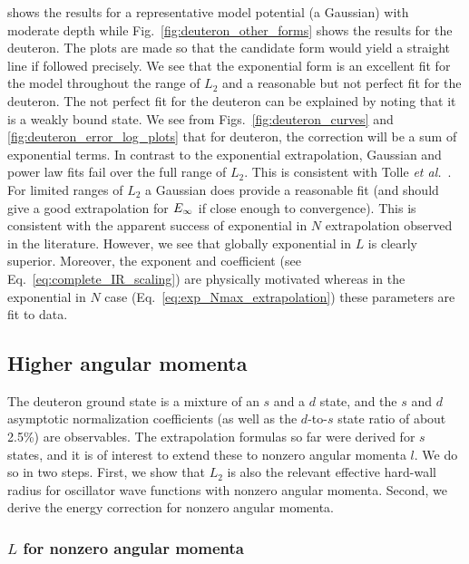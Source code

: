 	shows the results for a representative model potential (a Gaussian)
	with moderate depth while Fig.~\ref{fig:deuteron_other_forms} shows
	the results for the deuteron.  The plots are made so that the
	candidate form would yield a straight line if followed precisely.  We
	see that the exponential form is an excellent fit for the model
	throughout the range of $L_2$ and a reasonable but not perfect fit for
	the deuteron.  The not perfect fit for the deuteron can be explained
	by noting that it is a weakly bound state.  We see from
	Figs.~\ref{fig:deuteron_curves} and \ref{fig:deuteron_error_log_plots}
	that for deuteron, the correction will be a sum of exponential terms.
	In contrast to the exponential extrapolation, Gaussian and power law fits
	fail over the full range of $L_2$.  This is consistent with
	Tolle {\it et al.}~\cite{Tolle:2012cx}.  For limited ranges of $L_2$ a
	Gaussian does	provide a reasonable fit (and should give a good extrapolation
	for	$E_{\infty}$ if close enough to convergence).  This is consistent with the
	apparent success of exponential in $N$ extrapolation observed in the
	literature.  However, we see that globally exponential in $L$ is clearly
	superior.  Moreover, the exponent and coefficient (see
	Eq.~\eqref{eq:complete_IR_scaling}) are physically motivated whereas in the
	exponential in $N$ case (Eq.~\eqref{eq:exp_Nmax_extrapolation}) these
	parameters are fit to data.


	\subsection{Higher angular momenta}
	\label{subsec:higher_angular_momenta}

	The deuteron ground state is a mixture of an $s$ and a $d$ state, and
	the $s$ and $d$ asymptotic normalization coefficients (as well as the
	$d$-to-$s$ state ratio of about 2.5\%) are observables.  The
	extrapolation formulas so far were derived for $s$
	states, and it is of interest to extend these to nonzero angular
	momenta $l$.  We do so in two steps.  First, we show that $L_2$ is also
	the relevant effective hard-wall radius for oscillator wave functions
	with nonzero angular momenta.  Second, we derive the energy correction
	for nonzero angular momenta.

	\medskip
	\subsubsection{$L$ for nonzero angular momenta}

